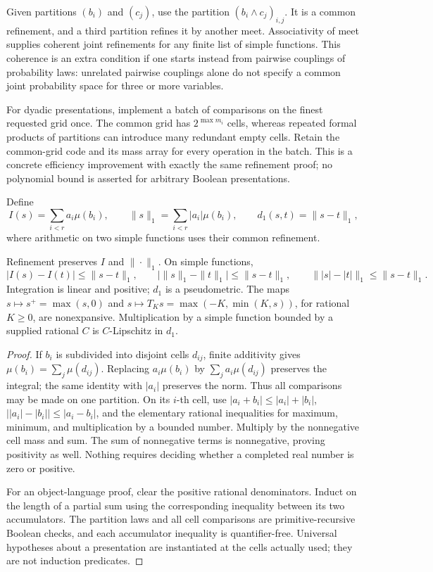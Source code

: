 Given partitions \((b_i)\) and \((c_j)\), use the partition
\((b_i\wedge c_j)_{i,j}\).  It is a common refinement, and a third partition
refines it by another meet.  Associativity of meet supplies coherent joint
refinements for any finite list of simple functions.  This coherence is an
extra condition if one starts instead from pairwise couplings of probability
laws: unrelated pairwise couplings alone do not specify a common joint
probability space for three or more variables.

For dyadic presentations, implement a batch of comparisons on the finest
requested grid once.  The common grid has \(2^{\max m_i}\) cells, whereas
repeated formal products of partitions can introduce many redundant empty
cells.  Retain the common-grid code and its mass array for every operation
in the batch.  This is a concrete efficiency improvement with exactly the
same refinement proof; no polynomial bound is asserted for arbitrary Boolean
presentations.

Define
\[
 I(s)=\sum_{i<r}a_i\mu(b_i),\qquad
 \|s\|_1=\sum_{i<r}|a_i|\mu(b_i),\qquad d_1(s,t)=\|s-t\|_1,
\]
where arithmetic on two simple functions uses their common refinement.

\begin{lemma}\label{lem:measure-finite}
Refinement preserves \(I\) and \(\|\cdot\|_1\).  On simple functions,
\[
 |I(s)-I(t)|\leq\|s-t\|_1,\qquad
 \bigl|\|s\|_1-\|t\|_1\bigr|\leq\|s-t\|_1,
 \qquad \||s|-|t|\|_1\leq\|s-t\|_1.
\]
Integration is linear and positive; \(d_1\) is a pseudometric.  The maps
\(s\mapsto s^+=\max(s,0)\) and
\(s\mapsto T_Ks=\max(-K,\min(K,s))\), for rational \(K\geq0\),
are nonexpansive.  Multiplication by a simple function bounded by a supplied
rational \(C\) is \(C\)-Lipschitz in \(d_1\).
\end{lemma}

\begin{proof}
If \(b_i\) is subdivided into disjoint cells \(d_{ij}\), finite additivity
gives \(\mu(b_i)=\sum_j\mu(d_{ij})\).  Replacing
\(a_i\mu(b_i)\) by \(\sum_j a_i\mu(d_{ij})\) preserves the integral;
the same identity with \(|a_i|\) preserves the norm.  Thus all comparisons
may be made on one partition.  On its \(i\)-th cell, use
\(|a_i+b_i|\leq|a_i|+|b_i|\),
\(\bigl||a_i|-|b_i|\bigr|\leq|a_i-b_i|\), and the elementary rational
inequalities for maximum, minimum, and multiplication by a bounded number.
Multiply by the nonnegative cell mass and sum.  The sum of nonnegative
terms is nonnegative, proving positivity as well.  Nothing requires deciding
whether a completed real number is zero or positive.

For an object-language proof, clear the positive rational denominators.
Induct on the length of a partial sum using the corresponding inequality
between its two accumulators.  The partition laws and all cell comparisons
are primitive-recursive Boolean checks, and each accumulator inequality is
quantifier-free.  Universal hypotheses about a presentation are instantiated
at the cells actually used; they are not induction predicates.
\end{proof}


